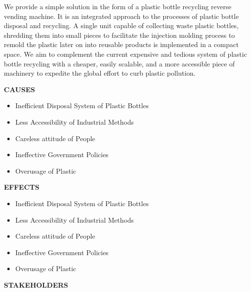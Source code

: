 \documentclass{article}
\begin{document}
\Large
\justifying
We provide a simple solution in the form of a plastic bottle recycling reverse vending machine. It is an integrated approach to the processes of plastic bottle disposal and recycling. A single unit capable of collecting waste plastic bottles, shredding them into small pieces to facilitate the injection molding process to remold the plastic later on into reusable products is implemented in a compact space. We aim to complement the current expensive and tedious system of plastic bottle recycling with a cheaper, easily scalable, and a more accessible piece of machinery to expedite the global effort to curb plastic pollution.

\vspace{2cm}
\begin{center}
    
    \LARGE{\textsc {\textbf{CAUSES}}}\\[0.5cm]
    
\end{center}

\begin{itemize}

    \item Inefficient Disposal System of Plastic Bottles
    \item Less Accessibility of Industrial Methods 
    \item Careless attitude of People
\item Ineffective Government Policies 
\item Overusage of Plastic
\end{itemize}


\begin{center}
    
    \LARGE{\textsc {\textbf{EFFECTS}}}\\[0.5cm]
    
\end{center}

\begin{itemize}
\Large
    \item Inefficient Disposal System of Plastic Bottles
    \item Less Accessibility of Industrial Methods 
    \item Careless attitude of People
\item Ineffective Government Policies 
\item Overusage of Plastic
\end{itemize}
\vspace{1cm}
\begin{center}
    \newpage
    \LARGE{\textsc {\textbf{STAKEHOLDERS}}}\\[0.5cm]
    
\end{center}
\end{document}
